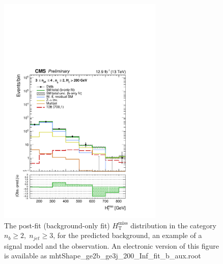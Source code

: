 \begin{figure}[tbhp]
    \caption{ 
    The post-fit (background-only fit) $H_{\mathrm{T}}^{\mathrm{miss}}$ distribution in the category $n_{b}\geq 2, \; n_{jet} \geq 3$, 
    for the predicted background, an example of a signal model and the observation.
    An electronic version of this figure is available as mhtShape\_ge2b\_ge3j\_200\_Inf\_fit\_b\_aux.root
    \label{fig:mhtShape_ge2b_ge3j_fit_b} }
  \begin{center}
  \includegraphics[width=0.7\textwidth]{mhtShape_ge2b_ge3j_200_Inf_fit_b_aux}
  \end{center}
\end{figure}


